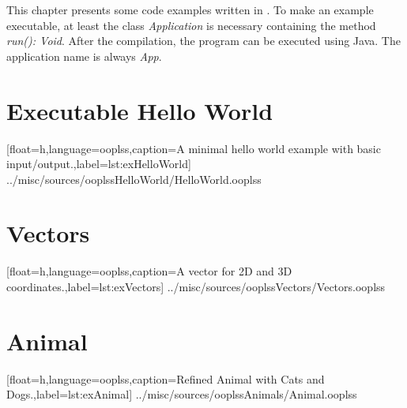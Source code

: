 This chapter presents some code examples written in \ooplss.  To make an
example executable, at least the class \emph{Application} is necessary
containing the method \emph{run(): Void}. After the compilation, the program
can be executed using Java. The application name is always \emph{App}.

\section{Executable Hello World}

[float=h,language=ooplss,caption=A minimal hello world example with basic input/output.,label=lst:exHelloWorld]
{../misc/sources/ooplssHelloWorld/HelloWorld.ooplss}

\newpage
\section{Vectors}

[float=h,language=ooplss,caption=A vector for 2D and 3D coordinates.,label=lst:exVectors]
{../misc/sources/ooplssVectors/Vectors.ooplss}

\newpage
\section{Animal}

[float=h,language=ooplss,caption=Refined Animal with Cats and Dogs.,label=lst:exAnimal]
{../misc/sources/ooplssAnimals/Animal.ooplss}

